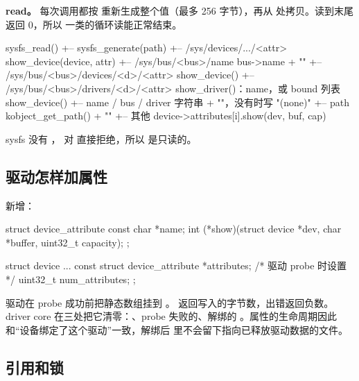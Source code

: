 \textbf{read。}  每次调用都按  重新生成整个值（最多 256 字节），再从  处拷贝。读到末尾返回 0，所以 一类的循环读能正常结束。

\begin{txtcode}
sysfs_read()
+-- sysfs_generate(path)
    +-- /sys/devices/.../<attr>              show_device(device, attr)
    +-- /sys/bus/<bus>/name                  bus->name + "\n"
    +-- /sys/bus/<bus>/devices/<d>/<attr>    show_device()
    +-- /sys/bus/<bus>/drivers/<d>/<attr>    show_driver()：name，或 bound 列表
show_device()
+-- name / bus / driver                      字符串 + "\n"，没有时写 "(none)"
+-- path                                     kobject_get_path() + "\n"
+-- 其他                                     device->attributes[i].show(dev, buf, cap)
\end{txtcode}

sysfs 没有 ， 对  直接拒绝，所以  是只读的。

\subsection{驱动怎样加属性}

 新增：

\begin{ccode}
struct device_attribute {
    const char *name;
    int (*show)(struct device *dev, char *buffer, uint32_t capacity);
};

struct device {
    ...
    const struct device_attribute *attributes;   /* 驱动 probe 时设置 */
    uint32_t num_attributes;
};
\end{ccode}

驱动在 probe 成功前把静态数组挂到 。 返回写入的字节数，出错返回负数。driver core 在三处把它清零：、probe 失败的、解绑的 。属性的生命周期因此和“设备绑定了这个驱动”一致，解绑后  里不会留下指向已释放驱动数据的文件。

\subsection{引用和锁}

